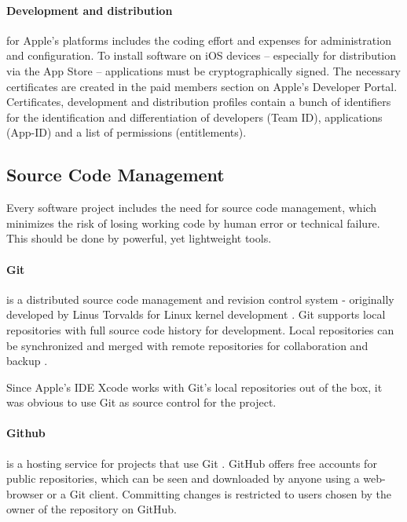 \paragraph{Development and distribution}
\label{sec:DAD}
for Apple's platforms includes the coding effort and expenses for administration and configuration. 
To install software on iOS devices – especially for distribution via the App Store – applications must be cryptographically signed. 
The necessary certificates are created in the paid members section on Apple's Developer Portal. 
Certificates, development and distribution profiles contain a bunch of identifiers for the identification and differentiation of developers (Team ID), 
applications (App-ID) and a list of permissions (entitlements). 

\subsection{Source Code Management}
\label{sec:SCM}

Every software project includes the need for source code management,
which minimizes the risk of losing working code
by human error or technical failure.
This should be done by powerful, yet lightweight tools.



\paragraph{Git}
\label{sec:GIT}
is a distributed source code management and revision control system 
- originally developed by Linus Torvalds for Linux kernel development \cite{Git:Main}.
Git supports local repositories with full source code history for development.
Local repositories can be synchronized and merged with remote repositories for collaboration and backup
\cite{Chacon:2009:PG:1618548}.

Since Apple's IDE Xcode works with Git's local repositories out of the box,
it was obvious to use Git as source control for the project.

\paragraph{Github}
\label{sec.GITHUB}
is a hosting service for projects that use Git \cite{GitHub:Main} . 
GitHub offers free accounts for public repositories, 
which can be seen and downloaded by anyone
using a web-browser or a Git client.
Committing changes is restricted to users chosen by the owner of the repository on GitHub.


